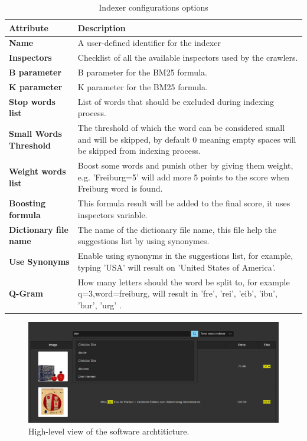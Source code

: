 \begin{table}[ht] 
{\footnotesize
\begin{tabular}{ P{2.5cm} ||P{11.1cm}  }      %
 \hline \hline
\textbf{Attribute} & \textbf{Description}\T\B 
\\ 
\hline
\textbf{Name} & A user-defined identifier for the indexer \T\B 
\\ 
\hline
\textbf{Inspectors} & Checklist of all the available inspectors used by the crawlers. \T\B 
\\ 
\hline
\textbf{B parameter} & B parameter for the BM25 formula. \T\B 
\\ 
\hline
\textbf{K parameter} & K parameter for the BM25 formula. \T\B 
\\ 
\hline
\textbf{Stop words list} & List of words that should be excluded during indexing process. \T\B 
\\ 
\hline
\textbf{Small Words Threshold} & The threshold of which the word can be considered small and will be skipped, by default 0 meaning empty spaces will be skipped from indexing process. \T\B 
\\ 
\hline
\textbf{Weight words list} & Boost some words and punish other by giving them weight, e.g. 'Freiburg=5' will add more 5 points to the score when Freiburg word is found. \T\B 
\\ 
\hline
\textbf{Boosting formula} & This formula result will be added to the final score, it uses inspectors variable. \T\B 
\\ 
\hline
\textbf{Dictionary file name} & The name of the dictionary file name, this file help the suggestions list by using synonymes. \T\B 
\\ 
\hline
\textbf{Use Synonyms} & Enable using synonyms in the suggestions list, for example, typing 'USA' will result on 'United States of America'. \T\B 
\\ 
\hline
\textbf{Q-Gram} & How many letters should the word be split to, for example q=3,word=freiburg, will result in { 'fre', 'rei', 'eib', 'ibu', 'bur', 'urg' }. \T\B 
\\ 
\hline \hline
    \end{tabular}
}
  \captionsetup{justification=centering,margin=2cm}
  \caption{Indexer configurations options}
\end{table}


\begin{figure}[h]	
     \centering
     \includegraphics[width=13cm]{images/demo-12.png}
     \caption{High-level view of the software archtiticture.}
     \label{fig:software-arch}
\end{figure}